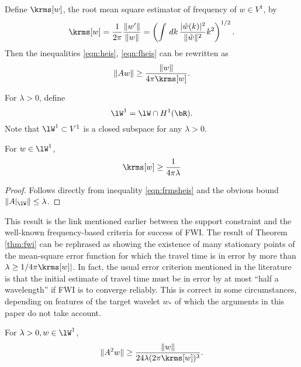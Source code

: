 Define $\krms[w]$, the root mean square estimator of frequency of $w
\in V^1$, by
\begin{equation}
  \label{eqn:krms}
  \krms[w]=\frac{1}{2\pi}\frac{\|w'\|}{\|w\|} = \left(\int
    \,dk\,\frac{|\hat{w}(k)|^2}{\|\hat{w}\|^2} k^2\right)^{1/2}.
\end{equation}
Then the inequalities \ref{eqn:heis}, \ref{eqn:fheis} can be rewritten as
\begin{equation}
  \label{eqn:frmsheis}
  \|Aw\| \ge \frac{\|w\|}{4\pi \krms[w]}.
\end{equation}

For $\lambda >0$, define
\begin{equation}
  \label{eqn:wlam1}
  \lW^1 = \lW \cap H^1(\bR).
\end{equation}
Note that $\lW^1 \subset V^1$ is a closed subspace for any
$\lambda>0$.

\begin{proposition}
  \label{thm:klam}
  For $w \in \lW^1$,
  \[
    \krms[w] \ge \frac{1}{4 \pi \lambda}
  \]
\end{proposition}

\begin{proof}
  Follows directly from inequality \ref{eqn:frmsheis} and the obvious bound
  $\|A|_{\lW}\|\le \lambda$.
\end{proof}

 This result is the link mentioned earlier between the support
constraint and the well-known frequency-based criteria for success of
FWI. The result of Theorem \ref{thm:fwi} can be rephrased as showing the
existence of many stationary points of the mean-square error function
for which the travel time is in error by more than
$\lambda \ge 1/{4 \pi \krms[w]|}$. In fact, the usual error criterion mentioned in the
literature is that the initial estimate of travel time must be in error by at most ``half a
wavelength'' if FWI is to converge reliably. This is correct in some
circumstances, depending on features of the target wavelet $w_*$ of
which the arguments in this paper do not take account.

\begin{proposition}
  \label{thm:heis2}
  For $\lambda>0, w \in \lW^1$,
  \begin{equation}
    \label{eqn:heis2}
    \|A^2w\| \ge \frac{\|w\|}{24 \lambda (2\pi\krms[w])^3}.
  \end{equation}
\end{proposition}

